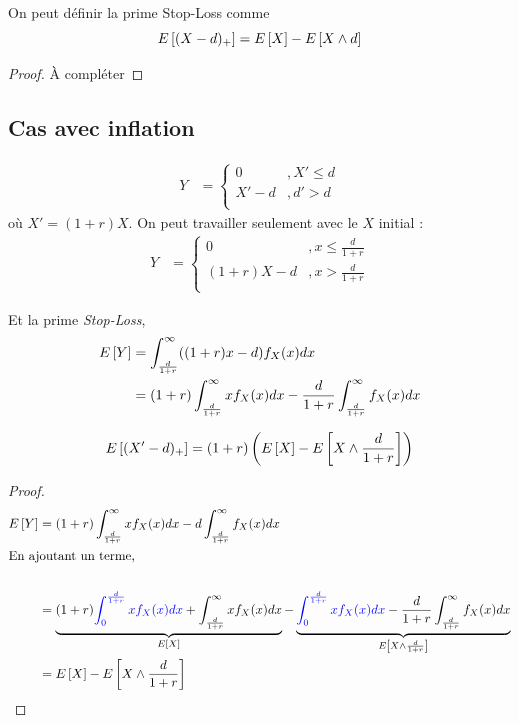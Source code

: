 \documentclass[12pt, french]{report}
\begin{document}
\begin{definition}
On peut définir la prime Stop-Loss comme
\begin{equation}
E \left[ (X-d)_+ \right] = E \left[ X \right] - E \left[ X \wedge d \right]
\end{equation}
\begin{proof}
À compléter
\end{proof}
\end{definition}

\subsection{Cas avec inflation}
\begin{align*}
Y	& = 
\begin{cases}
0		&, X' \leq d \\
X' - d	&, d' > d \\
\end{cases}
\end{align*}
où $X' = (1+r)X$. On peut travailler seulement avec le $X$ initial : 
\begin{align*}
Y	& = 
\begin{cases}
0			&, x \leq \frac{d}{1+r} \\
(1+r)X - d 	&, x > \frac{d}{1+r} \\
\end{cases}
\end{align*}

Et la prime \textit{Stop-Loss},
\begin{align*}
E \left[ Y \right]		& = \int_{\frac{d}{1+r}}^{\infty} ((1+r) x - d) f_X(x) dx \\
			& = (1+r) \int_{\frac{d}{1+r}}^{\infty} x f_X(x) dx - \frac{d}{1+r} \int_{\frac{d}{1+r}}^{\infty} f_X(x) dx \\
\end{align*}

\begin{definition}
\begin{equation}
E \left[ (X'-d)_+ \right] = (1+r) \left( E \left[ X \right] - E \left[ X \wedge \frac{d}{1+r} \right] \right)
\end{equation}
\end{definition}
\begin{proof}
\begin{align*}
E \left[ Y \right]	& = (1+r) \int_{\frac{d}{1+r}}^{\infty} x f_X(x) dx - d \int_{\frac{d}{1+r}}^{\infty} f_X(x) dx \\
	\shortintertext{En ajoutant un terme,} \\
	& = \underbrace{(1+r) \textcolor{blue}{\int_{0}^{\frac{d}{1+r}} x f_X(x) dx} + \int_{\frac{d}{1+r}}^{\infty} x f_X(x) dx}_{E \left[ X \right]} - \underbrace{\textcolor{blue}{ \int_{0}^{\frac{d}{1+r}} x f_X(x) dx} - \frac{d}{1+r} \int_{\frac{d}{1+r}}^{\infty} f_X(x) dx}_{E \left[ X \wedge \frac{d}{1+r} \right]} \\ 
	& = E \left[ X \right] - E \left[ X \wedge \frac{d}{1+r} \right] \\
\end{align*}
\end{proof}
\end{document}
